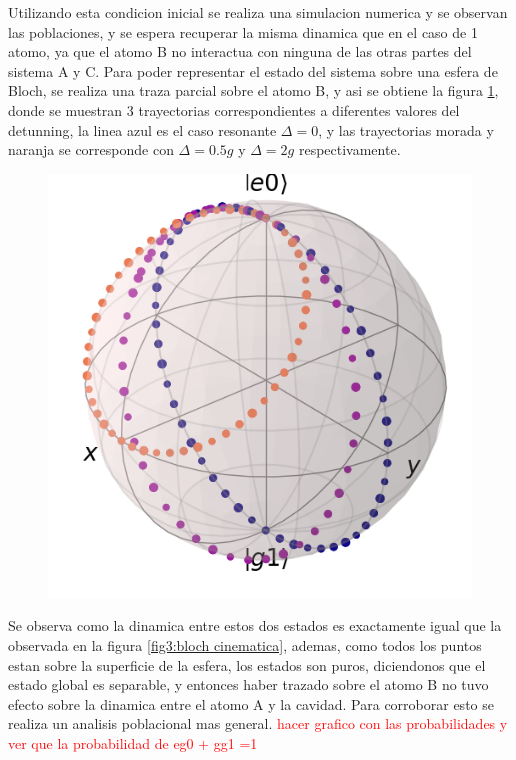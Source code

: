 Utilizando esta condicion inicial se realiza una simulacion numerica y se observan las poblaciones, y se espera recuperar la misma dinamica que en el caso de 1 atomo, ya que el atomo B no interactua con ninguna de las otras partes del sistema A y C. Para poder representar el estado del sistema sobre una esfera de Bloch, se realiza una traza parcial sobre el atomo B, y asi se obtiene la figura \ref{fig4:bloch delta}, donde se muestran 3 trayectorias correspondientes a diferentes valores del detunning, la linea azul es el caso resonante $\Delta=0$, y las trayectorias morada y naranja se corresponde con $\Delta=0.5g$ y $\Delta=2g$ respectivamente.
\begin{figure}[H]
    \begin{minipage}[c]{0.67\textwidth}
        \includegraphics[width=\textwidth]{figuras/ch4/eg0 bloch AC a=0 d=2.0 x=0.0 k=0.0 J=0.0 gamma=0.0 p=0.0.png}
    \end{minipage}\hfill
    \begin{minipage}[c]{0.3\textwidth}
    \caption{
         } \label{fig4:bloch delta}
  \end{minipage}
\end{figure}
Se observa como la dinamica entre estos dos estados es exactamente igual que la observada en la figura \ref{fig3:bloch cinematica}, ademas, como todos los puntos estan sobre la superficie de la esfera, los estados son puros, diciendonos que el estado global es separable, y entonces haber trazado sobre el atomo B no tuvo efecto sobre la dinamica entre el atomo A y la cavidad. Para corroborar esto se realiza un analisis poblacional mas general. \textcolor{red}{hacer grafico con las probabilidades y ver que la probabilidad de eg0 + gg1 =1}
